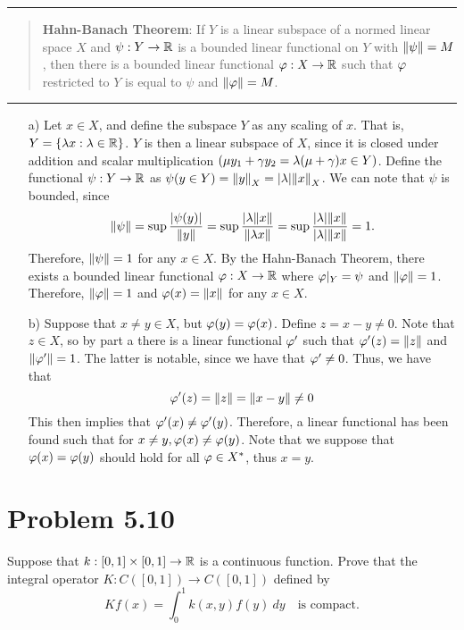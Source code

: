 \begin{solution}
    \begin{center}\rule{16.5cm}{0.5pt}\end{center}
    \begin{quote}
    \vspace{-6mm}
        \textbf{Hahn-Banach Theorem}: If $Y$ is a linear subspace of a normed linear space $X$ and $\psi: Y \rightarrow \mathbb{R}$ is a bounded linear functional on $Y$ with $\norm{\psi} = M$, then there is a bounded linear functional $\varphi : X \rightarrow \mathbb{R}$ such that $\varphi$ restricted to $Y$ is equal to $\psi$ and $\norm{\varphi} = M$.  
    \end{quote}
    \vspace{-12mm}
    \begin{center}\rule{16.5cm}{0.5pt}\end{center}
    \begin{itemize}
    \item [a)] Let $x \in X$, and define the subspace $Y$ as any scaling of $x$. That is, $Y = \{ \mathrm{\lambda} x : \mathrm{\lambda} \in \mathbb{R}\}$. $Y$ is then a linear subspace of $X$, since it is closed under addition and scalar multiplication $(\mu y_1 + \gamma y_2 = \mathrm{\lambda}(\mu + \gamma)x \in Y)$. Define the functional $\psi: Y \rightarrow \mathbb{R}$ as $\psi (y \in Y) = \norm{y}_X = |\mathrm{\lambda}|\norm{x}_X$. We can note that $\psi$ is bounded, since 
    \[\norm{\psi} = \sup \frac{|\psi(y)|}{\norm{y}} = \sup\frac{|\mathrm{\lambda} \norm{x}}{\norm{\mathrm{\lambda} x}} = \sup \frac{|\mathrm{\lambda}|\norm{x}}{|\mathrm{\lambda}| \norm{x}} = 1.\]
    Therefore, $\norm{\psi} = 1$ for any $x \in X$. By the Hahn-Banach Theorem, there exists a bounded linear functional $\varphi: X \rightarrow \mathbb{R}$ where $\varphi|_{Y} = \psi$ and $\norm{\varphi} = 1$. Therefore, $\norm{\varphi} = 1$ and $\varphi(x) = \norm{x}$ for any $x \in X$. 
    \item[b)] Suppose that $x \neq y \in X$, but $\varphi (y) = \varphi(x)$. Define $z = x - y \neq 0$. Note that $z \in X$, so by part a there is a linear functional $\varphi'$ such that $\varphi'(z) = \norm{z}$ and $\norm{\varphi'} = 1$. The latter is notable, since we have that $\varphi' \neq 0$. Thus, we have that 
    \[\varphi'(z) = \norm{z} = \norm{x - y} \neq 0\]
    This then implies that $\varphi'(x) \neq \varphi'(y)$. Therefore, a linear functional has been found such that for $x \neq y, \varphi(x) \neq \varphi(y)$. Note that we suppose that $\varphi(x) = \varphi(y)$ should hold for all $\varphi \in X^{*}$, thus $x = y$.
    \end{itemize}
\end{solution}

\newpage
\section{Problem 5.10}
Suppose that $k: [0, 1]\times [0, 1] \rightarrow \mathbb{R}$ is a continuous function. Prove that the integral operator $K : C([0, 1]) \rightarrow C([0, 1])$ defined by 
\[Kf(x) = \int_0^1 k(x, y) f(y) \ dy \quad \text{is compact.}\]

